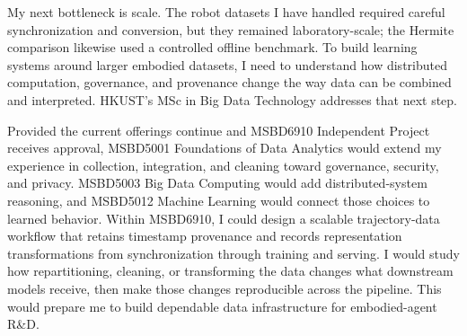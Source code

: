 My next bottleneck is scale. The robot datasets I have handled required careful synchronization and conversion, but they remained laboratory-scale; the Hermite comparison likewise used a controlled offline benchmark. To build learning systems around larger embodied datasets, I need to understand how distributed computation, governance, and provenance change the way data can be combined and interpreted. HKUST's MSc in Big Data Technology addresses that next step.

Provided the current offerings continue and MSBD6910 Independent Project receives approval, MSBD5001 Foundations of Data Analytics would extend my experience in collection, integration, and cleaning toward governance, security, and privacy. MSBD5003 Big Data Computing would add distributed-system reasoning, and MSBD5012 Machine Learning would connect those choices to learned behavior. Within MSBD6910, I could design a scalable trajectory-data workflow that retains timestamp provenance and records representation transformations from synchronization through training and serving. I would study how repartitioning, cleaning, or transforming the data changes what downstream models receive, then make those changes reproducible across the pipeline. This would prepare me to build dependable data infrastructure for embodied-agent R\&D.

